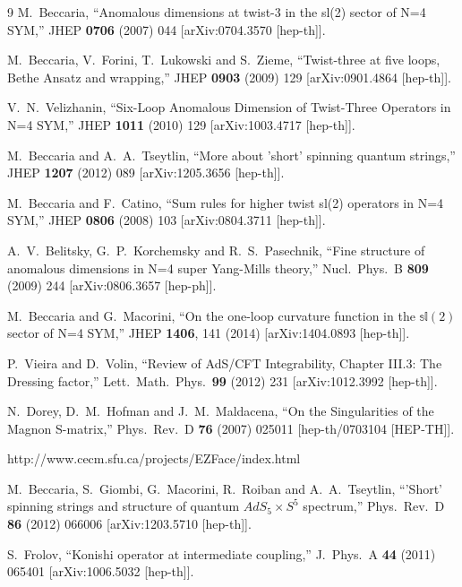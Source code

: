 \documentclass[a4paper,11pt]{article}
\numberwithin{equation}{section}
\begin{document}
\begin{thebibliography} {9}
  M.~Beccaria,
  ``Anomalous dimensions at twist-3 in the sl(2) sector of N=4 SYM,''
  JHEP {\bf 0706} (2007) 044
  [arXiv:0704.3570 [hep-th]].

  M.~Beccaria, V.~Forini, T.~Lukowski and S.~Zieme,
  ``Twist-three at five loops, Bethe Ansatz and wrapping,''
  JHEP {\bf 0903} (2009) 129
  [arXiv:0901.4864 [hep-th]].

  V.~N.~Velizhanin,
  ``Six-Loop Anomalous Dimension of Twist-Three Operators in N=4 SYM,''
  JHEP {\bf 1011} (2010) 129
  [arXiv:1003.4717 [hep-th]].

  M.~Beccaria and A.~A.~Tseytlin,
  ``More about 'short' spinning quantum strings,''
  JHEP {\bf 1207} (2012) 089
  [arXiv:1205.3656 [hep-th]].

  M.~Beccaria and F.~Catino,
  ``Sum rules for higher twist sl(2) operators in N=4 SYM,''
  JHEP {\bf 0806} (2008) 103
  [arXiv:0804.3711 [hep-th]].

  A.~V.~Belitsky, G.~P.~Korchemsky and R.~S.~Pasechnik,
  ``Fine structure of anomalous dimensions in N=4 super Yang-Mills theory,''
  Nucl.\ Phys.\ B {\bf 809} (2009) 244
  [arXiv:0806.3657 [hep-ph]].

  M.~Beccaria and G.~Macorini,
  ``On the one-loop curvature function in the $\mathbb{sl}(2)$ sector of N=4 SYM,''
  JHEP {\bf 1406}, 141 (2014)
  [arXiv:1404.0893 [hep-th]].

  P.~Vieira and D.~Volin,
  ``Review of AdS/CFT Integrability, Chapter III.3: The Dressing factor,''
  Lett.\ Math.\ Phys.\  {\bf 99} (2012) 231
  [arXiv:1012.3992 [hep-th]].

  N.~Dorey, D.~M.~Hofman and J.~M.~Maldacena,
  ``On the Singularities of the Magnon S-matrix,''
  Phys.\ Rev.\ D {\bf 76} (2007) 025011
  [hep-th/0703104 [HEP-TH]].

 http://www.cecm.sfu.ca/projects/EZFace/index.html

  M.~Beccaria, S.~Giombi, G.~Macorini, R.~Roiban and A.~A.~Tseytlin,
  ``'Short' spinning strings and structure of quantum $AdS_5 \times S^5$ spectrum,''
  Phys.\ Rev.\ D {\bf 86} (2012) 066006
  [arXiv:1203.5710 [hep-th]].

  S.~Frolov,
  ``Konishi operator at intermediate coupling,''
  J.\ Phys.\ A {\bf 44} (2011) 065401
  [arXiv:1006.5032 [hep-th]].


\end{thebibliography}
\end{document}
